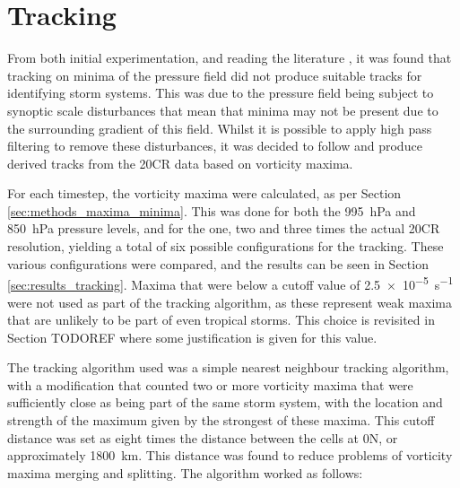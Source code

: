 \documentclass[pdftex,12pt,a4paper]{report}
\begin{document}
\section{Tracking}

From both initial experimentation, and reading the literature \parencite{TODOCITEmultiple}, it was found
that tracking on minima of the pressure field did not produce suitable tracks for identifying
storm systems. This was due to the pressure field being subject to synoptic scale disturbances
that mean that minima may not be present due to the surrounding gradient of this field. Whilst it is
possible to apply high pass filtering to remove these disturbances, it was decided to follow
\textcite{TODOCITEmultiple} and produce derived tracks from the 20CR data based on vorticity maxima.

For each timestep, the vorticity maxima were calculated, as per Section
\ref{sec:methods_maxima_minima}. This was done for both the \SI{995}{hPa} and \SI{850}{hPa} pressure
levels, and for the one, two and three times the actual 20CR resolution, yielding a total of six
possible configurations for the tracking. These various configurations were compared, and the
results can be seen in Section \ref{sec:results_tracking}. Maxima that were below a cutoff value
of \SI{2.5e-5}{s^{-1}} were not used as part of the tracking algorithm, as these represent weak maxima
that are unlikely to be part of even tropical storms. This choice is revisited in Section TODOREF where
some justification is given for this value.

The tracking algorithm used was a simple nearest neighbour tracking algorithm, with a modification
that counted two or more vorticity maxima that were sufficiently close as being part of the same storm
system, with the location and strength of the maximum given by the strongest of
these maxima. This cutoff distance was set as eight times the distance between the cells at
0\textdegree N, or approximately \SI{1800}{km}. This distance was found to reduce problems of
vorticity maxima merging and splitting. The algorithm worked as follows:
\end{document}
